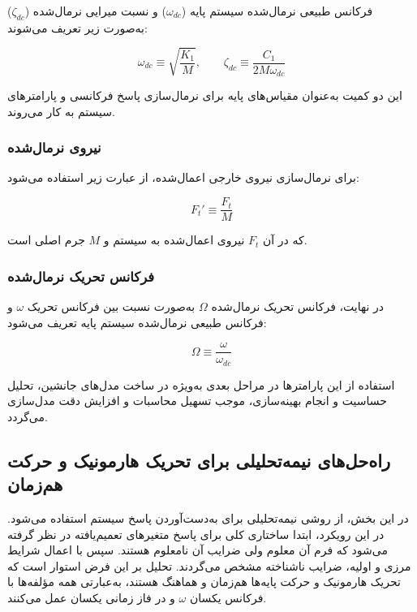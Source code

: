 فرکانس طبیعی نرمال‌شده سیستم پایه ($\omega_{dc}$) و نسبت میرایی نرمال‌شده ($\zeta_{dc}$) به‌صورت زیر تعریف می‌شوند:

\begin{equation}
\omega_{dc} \equiv \sqrt{\frac{K_1}{M}}, \qquad \zeta_{dc} \equiv \frac{C_1}{2M\omega_{dc}}
\end{equation}

این دو کمیت به‌عنوان مقیاس‌های پایه برای نرمال‌سازی پاسخ فرکانسی و پارامترهای سیستم به کار می‌روند.

\subsubsection*{نیروی نرمال‌شده}

برای نرمال‌سازی نیروی خارجی اعمال‌شده، از عبارت زیر استفاده می‌شود:

\begin{equation}
F_t' \equiv \frac{F_t}{M}
\end{equation}

که در آن $F_t$ نیروی اعمال‌شده به سیستم و $M$ جرم اصلی است.

\subsubsection*{فرکانس تحریک نرمال‌شده}

در نهایت، فرکانس تحریک نرمال‌شده $\Omega$ به‌صورت نسبت بین فرکانس تحریک $\omega$ و فرکانس طبیعی نرمال‌شده سیستم پایه تعریف می‌شود:

\begin{equation}
\Omega \equiv \frac{\omega}{\omega_{dc}}
\end{equation}

استفاده از این پارامترها در مراحل بعدی به‌ویژه در ساخت مدل‌های جانشین، تحلیل حساسیت و انجام بهینه‌سازی، موجب تسهیل محاسبات و افزایش دقت مدل‌سازی می‌گردد.


\subsection{راه‌حل‌های نیمه‌تحلیلی برای تحریک هارمونیک و حرکت هم‌زمان}

در این بخش، از روشی نیمه‌تحلیلی برای به‌دست‌آوردن پاسخ سیستم استفاده می‌شود. در این رویکرد، ابتدا ساختاری کلی برای پاسخ متغیرهای تعمیم‌یافته در نظر گرفته می‌شود که فرم آن معلوم ولی ضرایب آن نامعلوم هستند. سپس با اعمال شرایط مرزی و اولیه، ضرایب ناشناخته مشخص می‌گردند. تحلیل بر این فرض استوار است که تحریک هارمونیک و حرکت پایه‌ها هم‌زمان و هماهنگ هستند، به‌عبارتی همه مؤلفه‌ها با فرکانس یکسان $\omega$ و در فاز زمانی یکسان عمل می‌کنند.

